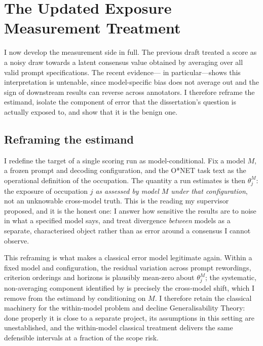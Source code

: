 \section{The Updated Exposure Measurement Treatment}

I now develop the measurement side in full. The previous draft treated a score as a noisy draw towards a latent consensus value obtained by averaging over all valid prompt specifications. The recent evidence---\citet{yin2026} in particular---shows this interpretation is untenable, since model-specific bias does not average out and the sign of downstream results can reverse across annotators. I therefore reframe the estimand, isolate the component of error that the dissertation's question is actually exposed to, and show that it is the benign one.

\subsection{Reframing the estimand}

I redefine the target of a single scoring run as model-conditional. Fix a model $M$, a frozen prompt and decoding configuration, and the O*NET task text as the operational definition of the occupation. The quantity a run estimates is then $\theta^{M}_{j}$: the exposure of occupation $j$ \emph{as assessed by model $M$ under that configuration}, not an unknowable cross-model truth. This is the reading my supervisor proposed, and it is the honest one: I answer how sensitive the results are to noise in what a specified model says, and treat divergence \emph{between} models as a separate, characterised object rather than as error around a consensus I cannot observe.

\begin{remark}
This reframing is what makes a classical error model legitimate again. Within a fixed model and configuration, the residual variation across prompt rewordings, criterion orderings and horizons is plausibly mean-zero about $\theta^{M}_j$; the systematic, non-averaging component identified by \citet{yin2026} is precisely the cross-model shift, which I remove from the estimand by conditioning on $M$. I therefore retain the classical machinery for the within-model problem and decline Generalisability Theory: done properly it is close to a separate project, its assumptions in this setting are unestablished, and the within-model classical treatment delivers the same defensible intervals at a fraction of the scope risk.
\end{remark}

